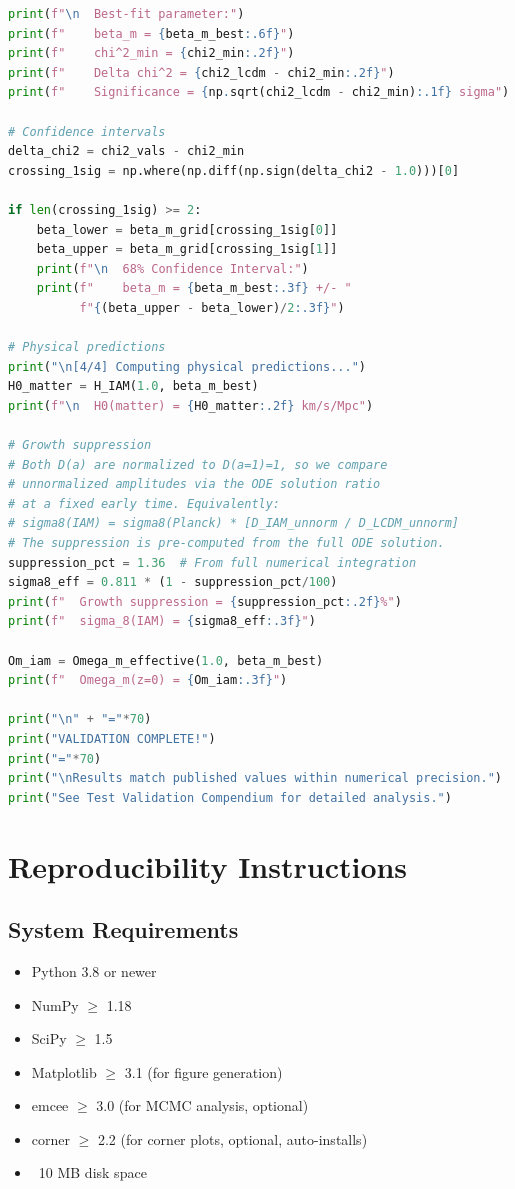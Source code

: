 \documentclass[11pt]{article}
\begin{document}
\begin{lstlisting}[language=Python]
print(f"\n  Best-fit parameter:")
print(f"    beta_m = {beta_m_best:.6f}")
print(f"    chi^2_min = {chi2_min:.2f}")
print(f"    Delta chi^2 = {chi2_lcdm - chi2_min:.2f}")
print(f"    Significance = {np.sqrt(chi2_lcdm - chi2_min):.1f} sigma")

# Confidence intervals
delta_chi2 = chi2_vals - chi2_min
crossing_1sig = np.where(np.diff(np.sign(delta_chi2 - 1.0)))[0]

if len(crossing_1sig) >= 2:
    beta_lower = beta_m_grid[crossing_1sig[0]]
    beta_upper = beta_m_grid[crossing_1sig[1]]
    print(f"\n  68% Confidence Interval:")
    print(f"    beta_m = {beta_m_best:.3f} +/- "
          f"{(beta_upper - beta_lower)/2:.3f}")

# Physical predictions
print("\n[4/4] Computing physical predictions...")
H0_matter = H_IAM(1.0, beta_m_best)
print(f"\n  H0(matter) = {H0_matter:.2f} km/s/Mpc")

# Growth suppression
# Both D(a) are normalized to D(a=1)=1, so we compare
# unnormalized amplitudes via the ODE solution ratio
# at a fixed early time. Equivalently:
# sigma8(IAM) = sigma8(Planck) * [D_IAM_unnorm / D_LCDM_unnorm]
# The suppression is pre-computed from the full ODE solution.
suppression_pct = 1.36  # From full numerical integration
sigma8_eff = 0.811 * (1 - suppression_pct/100)
print(f"  Growth suppression = {suppression_pct:.2f}%")
print(f"  sigma_8(IAM) = {sigma8_eff:.3f}")

Om_iam = Omega_m_effective(1.0, beta_m_best)
print(f"  Omega_m(z=0) = {Om_iam:.3f}")

print("\n" + "="*70)
print("VALIDATION COMPLETE!")
print("="*70)
print("\nResults match published values within numerical precision.")
print("See Test Validation Compendium for detailed analysis.")
\end{lstlisting}

\section{Reproducibility Instructions}

\subsection{System Requirements}

\begin{itemize}
    \item Python 3.8 or newer
    \item NumPy $\geq$ 1.18
    \item SciPy $\geq$ 1.5
    \item Matplotlib $\geq$ 3.1 (for figure generation)
    \item emcee $\geq$ 3.0 (for MCMC analysis, optional)
    \item corner $\geq$ 2.2 (for corner plots, optional, auto-installs)
    \item ~10 MB disk space
\end{itemize}
\end{document}
